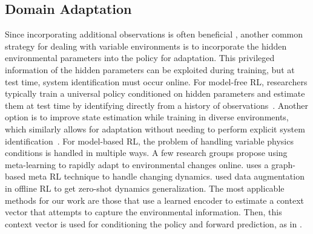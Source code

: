 \subsection{Domain Adaptation}
Since incorporating additional observations is often beneficial \cite{Kim2020ObservationSM}, another common strategy for dealing with variable environments is to incorporate the hidden environmental parameters into the policy for adaptation. This privileged information of the hidden parameters can be exploited during training, but at test time, system identification must occur online. For model-free RL, researchers typically train a universal policy conditioned on hidden parameters and estimate them at test time by identifying directly from a history of observations~\cite{Yu2017,Kumar2021,Nahrendra2023}. Another option is to improve state estimation while training in diverse environments, which similarly allows for adaptation without needing to perform explicit system identification~\cite{Ji2022}. 
For model-based RL, the problem of handling variable physics conditions is handled in multiple ways. A few research groups \cite{Nagabandi2018,Sæmundsson2018} propose using meta-learning to rapidly adapt to environmental changes online. \cite{Wang2021} uses a graph-based meta RL technique to handle changing dynamics. \cite{Ball2021} used data augmentation in offline RL to get zero-shot dynamics generalization. The most applicable methods for our work are those that use a learned encoder to estimate a context vector that attempts to capture the environmental information. Then, this context vector is used for conditioning the policy and forward prediction, as in \cite{Wang2022,Lee2020,Huang2021,Seo2020}.



